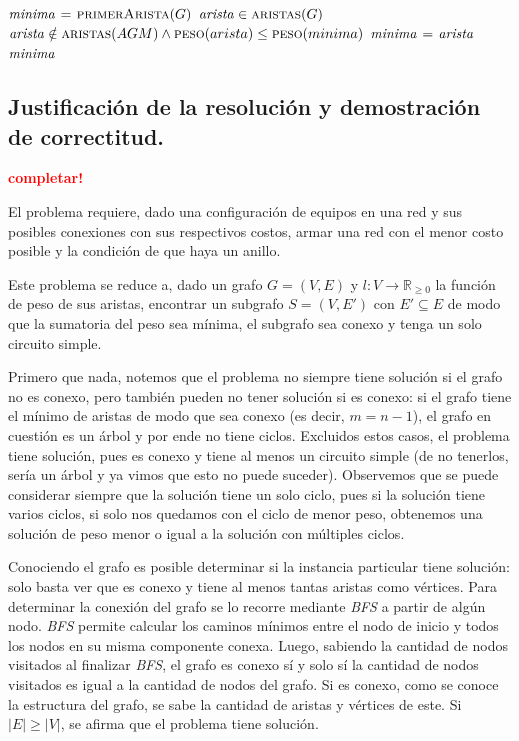 \begin{codebox}
\li $\id{minima} \gets \proc{primerArista}(G)$
\li \For $\id{arista} \in \proc{aristas}(G)$
      \Do
\li     \If $\id{arista} \notin \proc{aristas}(AGM) \land
            \proc{peso}(arista) \leq \proc{peso}(minima)$
            \Do
\li            $\id{minima} \gets \id{arista}$
            \End
      \End
\li \Return $\id{minima}$
\end{codebox}


\newpage
\subsection{Justificación de la resolución y demostración de correctitud.}

\vspace*{0.3cm}

\textcolor{red}{\textbf{completar!}}

El problema requiere, dado una configuración de equipos en una red y sus
posibles conexiones con sus respectivos costos, armar una red con el menor
costo posible y la condición de que haya un anillo.

Este problema se reduce a, dado un grafo $G = (V, E)$ y $l: V \to
\mathbb{R}_{\geq 0}$ la función de peso de sus aristas, encontrar un
subgrafo $S = (V, E')$ con $E' \subseteq E$ de modo que la sumatoria del
peso sea mínima, el subgrafo sea conexo y tenga un solo circuito simple.

Primero que nada, notemos que el problema no siempre tiene solución si el
grafo no es conexo, pero también pueden no tener solución si es conexo: si
el grafo tiene el mínimo de aristas de modo que sea conexo (es decir, $m = n
- 1$), el grafo en cuestión es un árbol y por ende no tiene ciclos.
Excluidos estos casos, el problema tiene solución, pues es conexo y tiene al
menos un circuito simple (de no tenerlos, sería un árbol y ya vimos que esto
no puede suceder). Observemos que se puede considerar siempre que la
solución tiene un solo ciclo, pues si la solución tiene varios ciclos, si
solo nos quedamos con el ciclo de menor peso, obtenemos una solución de peso
menor o igual a la solución con múltiples ciclos.

Conociendo el grafo es posible determinar si la instancia particular tiene
solución: solo basta ver que es conexo y tiene al menos tantas aristas como
vértices. Para determinar la conexión del grafo se lo recorre mediante
\textit{BFS} a partir de algún nodo. \textit{BFS} permite calcular los
caminos mínimos entre el nodo de inicio y todos los nodos en su misma
componente conexa. Luego, sabiendo la cantidad de nodos visitados al
finalizar \textit{BFS}, el grafo es conexo sí y solo sí la cantidad de nodos
visitados es igual a la cantidad de nodos del grafo. Si es conexo, como se
conoce la estructura del grafo, se sabe la cantidad de aristas y vértices de
este. Si $|E| \geq |V|$, se afirma que el problema tiene solución.

